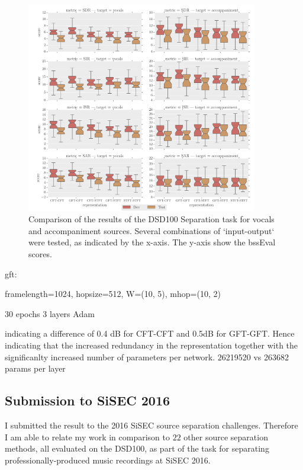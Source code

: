\begin{figure}[t]
\centering
\includegraphics[width=0.9\textwidth]{Chapters/06_Separation_Unknown/figures/boxplot.pdf}

\caption{Comparison of the results of the DSD100 Separation task for vocals and accompaniment sources. Several combinations of `input-output` were tested, as indicated by the x-axis. The y-axis show the bssEval scores.}

\end{figure}

gft:

framelength=1024,
hopsize=512,
W=(10, 5),
mhop=(10, 2)

30 epochs
3 layers
Adam~\cite{kingma14}

indicating a difference of 0.4 dB for CFT-CFT and 0.5dB for GFT-GFT. Hence indicating that the increased redundancy in the representation together with the significanlty increased number of parameters per network.
26219520 vs 263682 params per layer


\subsection{Submission to SiSEC 2016}
\label{ssec:performance}

I submitted the result to the 2016 SiSEC source separation challenges.
Therefore I am able to relate my work in comparison to $22$ other source separation methods, all evaluated on the DSD100, as part of the task for separating professionally-produced music recordings at SiSEC 2016.

